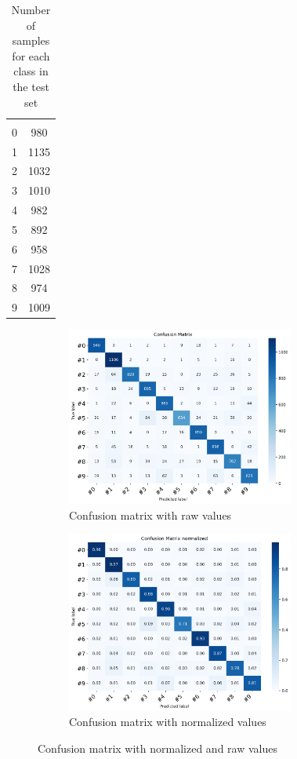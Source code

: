 \documentclass[a4paper]{article}    %
\begin{document}
\begin{table}[H]
    \begin{center}
        \begin{tabular}{|c|c|} 
            \cline{1-2}
            \cellcolor[gray]{0.8}{Digit} & \cellcolor[gray]{0.8}{nº of samples} \\
            \cline{1-2}
            0 &  980 \\
            1 & 1135 \\
            2 & 1032 \\
            3 & 1010 \\
            4 &  982 \\
            5 &  892 \\
            6 &  958 \\
            7 & 1028 \\
            8 &  974 \\
            9 & 1009 \\
            \cline{1-2}
        \end{tabular}
    \end{center}
    \caption{Number of samples for each class in the test set}
    \label{tab:samples_test_set}
\end{table}

\begin{figure}[H]
    \centering
    \begin{subfigure}{0.48\textwidth}
        \centering
        \includegraphics[width=7.5cm]{cm_raw}
        \caption{Confusion matrix with raw values}
        \label{fig:cm_raw}
    \end{subfigure}
    \hfill
    \begin{subfigure}{0.48\textwidth}
        \centering
        \includegraphics[width=7.5cm]{cm_norm}
        \caption{Confusion matrix with normalized values}
        \label{fig:cm_norm}
    \end{subfigure}
    \hfill
    \caption{Confusion matrix with normalized and raw values} 
    \label{fig:cm}
\end{figure}
\end{document}
